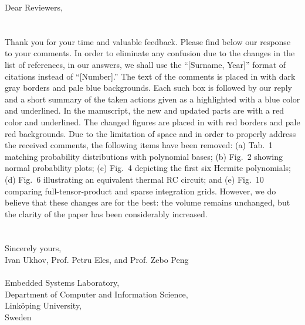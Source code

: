 Dear Reviewers,
\\
\\
\\
\noindent Thank you for your time and valuable feedback.
Please find below our response to your comments.
In order to eliminate any confusion due to the changes in the list of references, in our answers, we shall use the ``[Surname, Year]'' format of citations instead of ``[Number].''
The text of the comments is placed in  with dark gray borders and pale blue backgrounds.
Each such box is followed by our reply and a short summary of the taken actions given as a  highlighted with a blue color and underlined.
In the manuscript, the new and updated parts are  with a red color and underlined.
The changed figures are placed in  with red borders and pale red backgrounds.
Due to the limitation of space and in order to properly address the received comments, the following items have been removed:
(a) Tab.~1 matching probability distributions with polynomial bases;
(b) Fig.~2 showing normal probability plots;
(c) Fig.~4 depicting the first six Hermite polynomials;
(d) Fig.~6 illustrating an equivalent thermal RC circuit; and
(e) Fig.~10 comparing full-tensor-product and sparse integration grids.
However, we do believe that these changes are for the best: the volume remains unchanged, but the clarity of the paper has been considerably increased.
\\
\\
\\
\noindent Sincerely yours,\\
Ivan Ukhov, Prof. Petru Eles, and Prof. Zebo Peng
\\
\\
\noindent Embedded Systems Laboratory,\\
Department of Computer and Information Science,\\
Link\"{o}ping University,\\
Sweden
